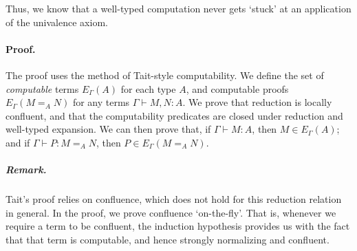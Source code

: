 \documentclass{easychair}
\begin{document}
Thus, we know that a well-typed computation never gets `stuck' at an application of the univalence axiom.

\paragraph{Proof.}

The proof uses the method of Tait-style computability.
We define the set of \emph{computable} terms $E_\Gamma(A)$ for each type $A$,
and computable proofs $E_\Gamma(M =_A N)$ for any terms $\Gamma \vdash M,N : A$. We prove that reduction is locally confluent, and that the computability predicates are closed under reduction and well-typed expansion.  We can then prove that, if $\Gamma \vdash M : A$, then $M \in E_\Gamma(A)$; and if $\Gamma \vdash P : M =_A N$, then $P \in E_\Gamma(M =_A N)$. 

\subparagraph{Remark.} Tait's proof relies on confluence, which does not hold for this reduction relation in general.  In the proof, we prove confluence `on-the-fly'.  That is, whenever we require a term to be confluent, the induction hypothesis provides us with the fact that that term is computable, and hence strongly normalizing and confluent.


%
\end{document}
